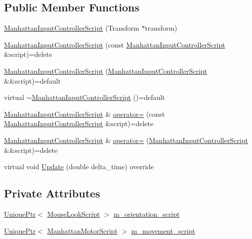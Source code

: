 \subsection*{Public Member Functions}
\begin{DoxyCompactItemize}
\item 
\hyperlink{classmage_1_1_manhattan_input_controller_script_a66462b00352cb8aee2f7de76b195d39d}{Manhattan\+Input\+Controller\+Script} (Transform $\ast$transform)
\item 
\hyperlink{classmage_1_1_manhattan_input_controller_script_ad16da80362158de342ecf8d669fbbe15}{Manhattan\+Input\+Controller\+Script} (const \hyperlink{classmage_1_1_manhattan_input_controller_script}{Manhattan\+Input\+Controller\+Script} \&script)=delete
\item 
\hyperlink{classmage_1_1_manhattan_input_controller_script_ad17804aa997c9adb3cbecb2a6bfbfda3}{Manhattan\+Input\+Controller\+Script} (\hyperlink{classmage_1_1_manhattan_input_controller_script}{Manhattan\+Input\+Controller\+Script} \&\&script)=default
\item 
virtual \hyperlink{classmage_1_1_manhattan_input_controller_script_ae4adff57a2d77647ab0b7b89d7bda6d0}{$\sim$\+Manhattan\+Input\+Controller\+Script} ()=default
\item 
\hyperlink{classmage_1_1_manhattan_input_controller_script}{Manhattan\+Input\+Controller\+Script} \& \hyperlink{classmage_1_1_manhattan_input_controller_script_a07fdb2fee8a1eb793c2d54853c9e4998}{operator=} (const \hyperlink{classmage_1_1_manhattan_input_controller_script}{Manhattan\+Input\+Controller\+Script} \&script)=delete
\item 
\hyperlink{classmage_1_1_manhattan_input_controller_script}{Manhattan\+Input\+Controller\+Script} \& \hyperlink{classmage_1_1_manhattan_input_controller_script_acea874b94a4531c393af739824012a1a}{operator=} (\hyperlink{classmage_1_1_manhattan_input_controller_script}{Manhattan\+Input\+Controller\+Script} \&\&script)=delete
\item 
virtual void \hyperlink{classmage_1_1_manhattan_input_controller_script_adfd98377642722fae5db6e005b2c6c3e}{Update} (double delta\+\_\+time) override
\end{DoxyCompactItemize}
\subsection*{Private Attributes}
\begin{DoxyCompactItemize}
\item 
\hyperlink{namespacemage_a8c307fbcc33bce9b7f2aa4c26c3b95cf}{Unique\+Ptr}$<$ \hyperlink{classmage_1_1_mouse_look_script}{Mouse\+Look\+Script} $>$ \hyperlink{classmage_1_1_manhattan_input_controller_script_add3be278d93719ba235d4606d555bd2a}{m\+\_\+orientation\+\_\+script}
\item 
\hyperlink{namespacemage_a8c307fbcc33bce9b7f2aa4c26c3b95cf}{Unique\+Ptr}$<$ \hyperlink{classmage_1_1_manhattan_motor_script}{Manhattan\+Motor\+Script} $>$ \hyperlink{classmage_1_1_manhattan_input_controller_script_ad3b6525bba021f03c17d2de6f5e54101}{m\+\_\+movement\+\_\+script}
\end{DoxyCompactItemize}
